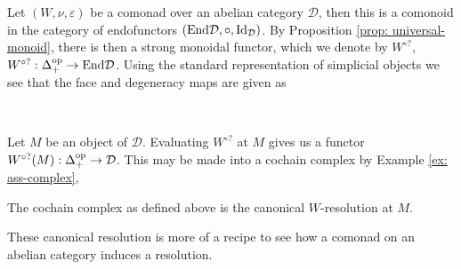 \documentclass[../thesis.tex]{subfiles}
\begin{document}
        Let $(W, \nu, \varepsilon)$ be a comonad over an abelian category $\mathcal{D}$, then this is a comonoid in the category of endofunctors $(\tt{End}\mathcal{D}, \circ, \tt{Id}_\mathcal{D})$. By Proposition \ref{prop: universal-monoid}, there is then a strong monoidal functor, which we denote by $W^{\circ ?}$, $W^{\circ ?} : \Delta_+^{\tt{op}} \rightarrow \tt{End}\mathcal{D}$. Using the standard representation of simplicial objects we see that the face and degeneracy maps are given as
        \begin{center}
             \\
        \end{center}
        Let $M$ be an object of $\mathcal{D}$. Evaluating $W^{\circ ?}$ at $M$ gives us a functor $W^{\circ ?}(M) : \Delta^{\tt{op}}_+ \rightarrow \mathcal{D}$. This may be made into a cochain complex by Example \ref{ex: ass-complex},
        \begin{center}
        \end{center}

        \begin{definition}
            The cochain complex as defined above is the canonical $W$-resolution at $M$.
        \end{definition}

        These canonical resolution is more of a recipe to see how a comonad on an abelian category induces a resolution.
\end{document}

